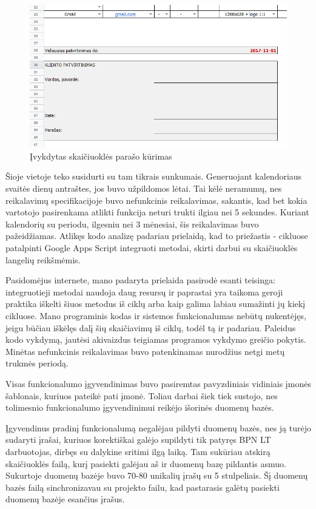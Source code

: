 \documentclass{VUMIFPSkursinis}
\begin{document}
\begin{figure}[H]
    \centering
    \includegraphics[scale=0.5]{img/signature}
    \caption{Įvykdytas skaičiuoklės parašo kūrimas}
    \label{img:model}
\end{figure}

Šioje vietoje teko susidurti su tam tikrais sunkumais. Generuojant kalendoriaus svaitės dienų antraštes, jos buvo užpildomos lėtai. Tai kėlė neramumų, nes reikalavimų specifikacijoje buvo nefunkcinis reikalavimas, sakantis, kad bet kokia vartotojo pasirenkama atlikti funkcija neturi trukti ilgiau nei 5 sekundes. Kuriant kalendorių su periodu, ilgesniu nei 3 mėnesiai, šis reikalavimas buvo pažeidžiamas. Atlikęs kodo analizę padariau prielaidą, kad to priežastis - cikluose patalpinti Google Apps Script integruoti metodai, skirti darbui su skaičiuoklės langelių reikšmėmis. 

Pasidomėjus internete, mano padaryta prielaida pasirodė esanti teisinga: integruotieji metodai naudoja daug resursų ir paprastai yra taikoma geroji praktika iškelti šiuos metodus iš ciklų arba kaip galima labiau sumažinti jų kiekį cikluose. Mano programinis kodas ir sistemos funkcionalumas nebūtų nukentėjęs, jeigu būčiau iškėlęs dalį šių skaičiavimų iš ciklų, todėl tą ir padariau. Paleidus kodo vykdymą, jautėsi akivaizdus teigiamas programos vykdymo greičio pokytis. Minėtas nefunkcinis reikalavimas buvo patenkinamas nurodžius netgi metų trukmės periodą.

Visas funkcionalumo įgyvendinimas buvo pasiremtas pavyzdiniais vidiniais įmonės šablonais, kuriuos pateikė pati įmonė. Toliau darbai šiek tiek sustojo, nes tolimesnio funkcionalumo įgyvendinimui reikėjo išorinės duomenų bazės. 

Įgyvendinus pradinį funkcionalumą negalėjau pildyti duomenų bazės, nes ją turėjo sudaryti įrašai, kuriuos korektiškai galėjo supildyti tik patyręs BPN LT darbuotojas, dirbęs su dalykine sritimi ilgą laiką. Tam sukūriau atskirą skaičiuoklės failą, kurį pasiekti galėjau aš ir duomenų bazę pildantis asmuo. Sukurtoje duomenų bazėje buvo 70-80 unikalių įrašų su 5 stulpeliais. Šį duomenų bazės failą sinchronizavau su projekto failu, kad pastarasis galėtų pasiekti duomenų bazėje esančius įrašus.
\end{document}
